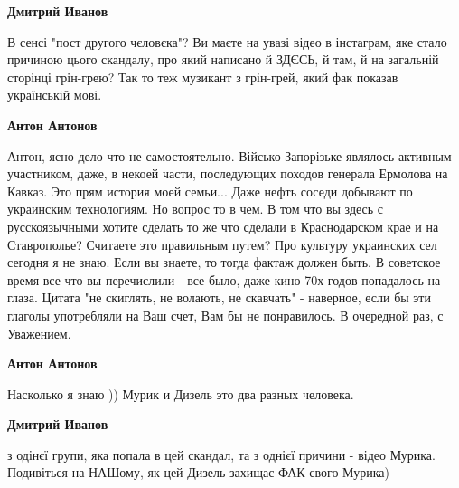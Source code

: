 \begin{itemize}
\begin{itemize}
\textbf{Дмитрий Иванов} 

В сенсі "пост другого чєловєка"? Ви маєте на увазі відео в інстаграм, яке стало
причиною цього скандалу, про який написано й ЗДЄСЬ, й там, й на загальній
сторінці грін-грею? Так то теж музикант з грін-грей, який фак показав
українській мові.


 
\textbf{Антон Антонов} 

Антон, ясно дело что не самостоятельно. Військо Запорізьке являлось активным
участником, даже, в некоей части, последующих походов генерала Ермолова на
Кавказ. Это прям история моей семьи... Даже нефть соседи добывают по украинским
технологиям. Но вопрос то в чем. В том что вы здесь с русскоязычными хотите
сделать то же что сделали в Краснодарском крае и на Ставрополье? Считаете это
правильным путем? Про культуру украинских сел сегодня я не знаю. Если вы
знаете, то тогда фактаж должен быть. В советское время все что вы перечислили -
все было, даже кино 70х годов попадалось на глаза. Цитата "не скиглять, не
волають, не скавчать" - наверное, если бы эти глаголы употребляли на Ваш счет,
Вам бы не понравилось. В очередной раз, с Уважением.


 
\textbf{Антон Антонов} 

Насколько я знаю )) Мурик и Дизель это два разных человека.

 
\textbf{Дмитрий Иванов} 

з одінєї групи, яка попала в цей скандал, та з однієї причини - відео Мурика.
Подивіться на НАШому, як цей Дизель захищає ФАК свого Мурика)


 

\end{itemize}
\end{itemize}
